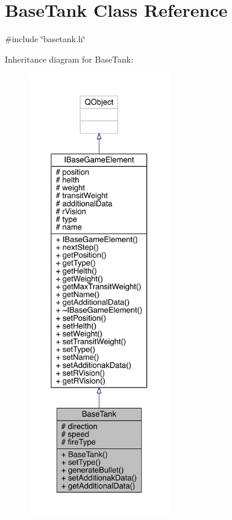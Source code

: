 \hypertarget{a00157}{}\section{Base\+Tank Class Reference}
\label{a00157}


{\ttfamily \#include \char`\"{}basetank.\+h\char`\"{}}



Inheritance diagram for Base\+Tank\+:
\nopagebreak
\begin{figure}[H]
\begin{center}
\leavevmode
\includegraphics[height=550pt]{d2/d34/a00156}
\end{center}
\end{figure}


